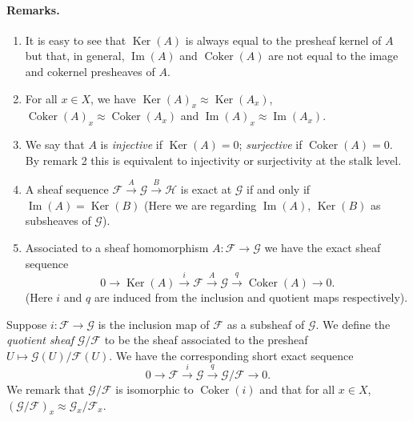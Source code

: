 \paragraph{Remarks.}
\begin{enumerate}
\item It is easy to see that $\operatorname{Ker}(A)$ is always equal to the presheaf kernel of $A$ but that, in general, $\operatorname{Im}(A)$ and $\operatorname{Coker}(A)$ are not equal to the image and cokernel presheaves of $A$.
\item For all $x\in X$, we have $\operatorname{Ker}(A)_x\approx\operatorname{Ker}(A_x)$, $\operatorname{Coker}(A)_x\approx\operatorname{Coker}(A_x)$ and $\operatorname{Im}(A)_x\approx\operatorname{Im}(A_x)$.
\item We say that $A$ is \emph{injective} if $\operatorname{Ker}(A)=0$; \emph{surjective} if $\operatorname{Coker}(A)=0$. By remark 2 this is equivalent to injectivity or surjectivity at the stalk level.
\item A sheaf sequence $\mathcal F\xrightarrow{A}\mathcal G\xrightarrow{B}\mathcal H$ is exact at $\mathcal G$ if and only if $\operatorname{Im}(A)=\operatorname{Ker}(B)$ (Here we are regarding $\operatorname{Im}(A)$, $\operatorname{Ker}(B)$ as subsheaves of $\mathcal G$).
\item Associated to a sheaf homomorphism $A:\mathcal F\to\mathcal G$ we have the exact sheaf sequence
\[
0\to\operatorname{Ker}(A)\xrightarrow{i}\mathcal F\xrightarrow{A}\mathcal G\xrightarrow{q}\operatorname{Coker}(A)\to0.
\]
(Here $i$ and $q$ are induced from the inclusion and quotient maps respectively).
\end{enumerate}
Suppose $i:\mathcal F\to\mathcal G$ is the inclusion map of $\mathcal F$ as a subsheaf of $\mathcal G$. We define the \emph{quotient sheaf} $\mathcal G/\mathcal F$ to be the sheaf associated to the presheaf $U\mapsto\mathcal G(U)/\mathcal F(U)$. We have the corresponding short exact sequence
\[
0\to\mathcal F\xrightarrow{i}\mathcal G\xrightarrow{q}\mathcal G/\mathcal F\to0.
\]
We remark that $\mathcal G/\mathcal F$ is isomorphic to $\operatorname{Coker}(i)$ and that for all $x\in X$, $(\mathcal G/\mathcal F)_x\approx\mathcal G_x/\mathcal F_x$.


